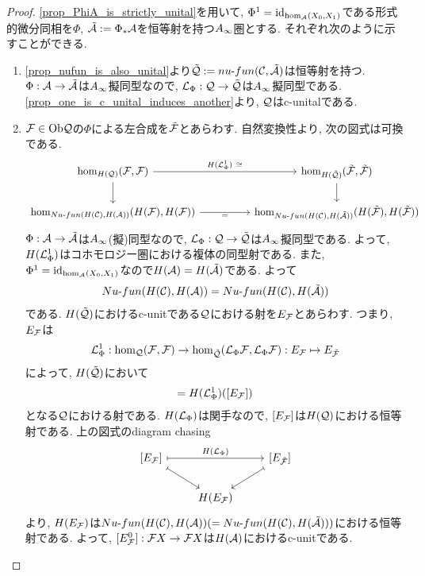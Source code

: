 \documentclass[uplatex, a4paper, 14Q, dvipdfmx]{jsarticle}
\begin{document}
\begin{proof}
  \cref{prop_PhiA_is_strictly_unital}を用いて, $\Phi^1=\mathrm{id}_{\hom_{\mathcal{A}}(X_0,X_1)}$である形式的微分同相を$\Phi$, $\tilde{\mathcal{A}} := \Phi_\ast \mathcal{A}$を恒等射を持つ$A_{\infty}$圏とする. 
  それぞれ次のように示すことができる. 
  \begin{enumerate}
    \item \cref{prop_nufun_is_also_unital}より$\tilde{\mathcal{Q}} := nu \text{-} fun (\mathcal{C}, \tilde{\mathcal{A}})$は恒等射を持つ. 
    $\Phi : \mathcal{A} \to \tilde{\mathcal{A}}$は$A_{\infty}$擬同型なので, $\mathcal{L}_\Phi : \mathcal{Q} \to \tilde{\mathcal{Q}}$は$A_{\infty}$擬同型である. 
    \cref{prop_one_is_c_unital_induces_another}より, $\mathcal{Q}$はc-unitalである.
    \item $\mathcal{F} \in \mathrm{Ob}\mathcal{Q}$の$\Phi$による左合成を$\tilde{\mathcal{F}}$とあらわす. 
    自然変換性より, 次の図式は可換である.
    \[\begin{tikzcd}
      {\hom_{H(\Q)}(\F,\F)} && {\hom_{H(\tilQ)}(\tilF,\tilF)} \\
      {\hom_{\Nufun{\C}{\A}}(H(\F),H(\F))} && {\hom_{\Nufun{\C}{\tilA}}(H(\tilF),H(\tilF))}
      \arrow["{H(\L^1_\Phi) ~ \cong}", from=1-1, to=1-3]
      \arrow[from=1-1, to=2-1]
      \arrow[from=1-3, to=2-3]
      \arrow["="', from=2-1, to=2-3]   
    \end{tikzcd}\]
    $\Phi : \mathcal{A} \to \tilde{\mathcal{A}}$は$A_{\infty}$(擬)同型なので, $\mathcal{L}_\Phi : \mathcal{Q} \to \tilde{\mathcal{Q}}$は$A_{\infty}$擬同型である. 
    よって, $H(\mathcal{L}^1_\Phi)$はコホモロジー圏における複体の同型射である. 
    また, $\Phi^1=\mathrm{id}_{\hom_{\mathcal{A}}(X_0,X_1)}$なので$H(\mathcal{A}) = H(\tilde{\mathcal{A}})$である. よって
    \begin{align*}
      Nu \text{-} fun (H(\mathcal{C}), H(\mathcal{A})) = Nu \text{-} fun (H(\mathcal{C}), H(\tilde{\mathcal{A}}))
    \end{align*}
    である. 
    $H(\tilde{\mathcal{Q}})$におけるc-unitである$\mathcal{Q}$における射を$E_{\mathcal{F}}$とあらわす. 
    つまり, $E_{\mathcal{F}}$は
    \begin{align*}
      \mathcal{L}^1_\Phi : \hom_{\mathcal{Q}}(\mathcal{F},\mathcal{F}) \to \hom_{\tilde{\mathcal{Q}}}(\mathcal{L}_\Phi \mathcal{F},\mathcal{L}_\Phi \mathcal{F}) : E_{\mathcal{F}} \mapsto  E_{\tilde{\mathcal{F}}}
    \end{align*}
    によって, $H(\tilde{\mathcal{Q}})$において
    \begin{align*}
      [E_{\tilF}] = H(\L^1_\Phi)([E_\F])
    \end{align*}
    となる$\mathcal{Q}$における射である. 
    $H(\mathcal{L}_\Phi)$は関手なので, $[E_{\mathcal{F}}]$は$H(\mathcal{Q})$における恒等射である. 
    上の図式のdiagram chasing
    \[\begin{tikzcd}
      {[E_\F]} && {[E_{\tilF}]} \\
      & {H(E_\F)}
      \arrow["{H(\L_\Phi)}", maps to, from=1-1, to=1-3]
      \arrow[maps to, from=1-1, to=2-2]
      \arrow[maps to, from=1-3, to=2-2]
    \end{tikzcd}\]
    より, $H(E_{\mathcal{F}})$は$Nu \text{-} fun (H(\mathcal{C}), H(\mathcal{A}))(= Nu \text{-} fun (H(\mathcal{C}), H(\tilde{\mathcal{A}})))$における恒等射である. 
    よって, $[E_{\mathcal{F}}^0] : \mathcal{F} X \to \mathcal{F} X$は$H(\mathcal{A})$におけるc-unitである. 
  \end{enumerate}
\end{proof}
\end{document}
